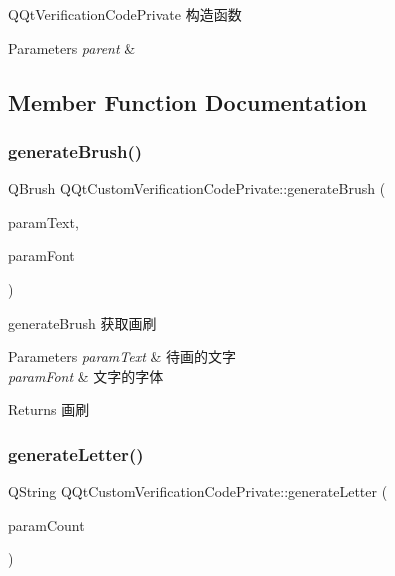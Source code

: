 Q\+Qt\+Verification\+Code\+Private 构造函数 


\begin{DoxyParams}{Parameters}
{\em parent} & \\
\hline
\end{DoxyParams}


\subsection{Member Function Documentation}
\mbox{\label{class_q_qt_custom_verification_code_private_a730d6ed5d80cb956f7df2a8457d022a2}} 
\subsubsection{\texorpdfstring{generate\+Brush()}{generateBrush()}}
{\footnotesize\ttfamily Q\+Brush Q\+Qt\+Custom\+Verification\+Code\+Private\+::generate\+Brush (\begin{DoxyParamCaption}\item[{Q\+String}]{param\+Text,  }\item[{Q\+Font}]{param\+Font }\end{DoxyParamCaption})}



generate\+Brush 获取画刷 


\begin{DoxyParams}{Parameters}
{\em param\+Text} & 待画的文字 \\
\hline
{\em param\+Font} & 文字的字体 \\
\hline
\end{DoxyParams}
\begin{DoxyReturn}{Returns}
画刷 
\end{DoxyReturn}
\mbox{\label{class_q_qt_custom_verification_code_private_a6b3f8f71fbd5410622676fce6c84c1ee}} 
\subsubsection{\texorpdfstring{generate\+Letter()}{generateLetter()}}
{\footnotesize\ttfamily Q\+String Q\+Qt\+Custom\+Verification\+Code\+Private\+::generate\+Letter (\begin{DoxyParamCaption}\item[{quint16}]{param\+Count }\end{DoxyParamCaption})}



